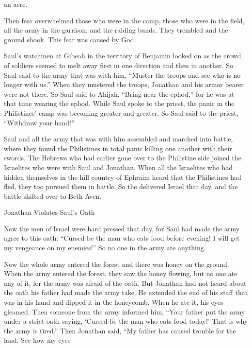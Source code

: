 {an acre.
\par }{\PP {}Then fear overwhelmed
those who were in the camp,
those who were in the field,
all
the army
in the garrison,
and the raiding bands.
They
trembled
and the ground
shook.
This fear
was
caused by God.
\par }{\PP {}Saul’s
watchmen
at Gibeah
in the territory of Benjamin
looked
on
as the crowd
of soldiers seemed to melt
away
first in one direction
and then in another.
So Saul
said
to the army
that
was with
him, “Muster
the troops and see
who
is no longer with
us.” When
they mustered
the troops,
Jonathan
and his armor
bearer
were not there.
So Saul
said
to Ahijah,
“Bring near
the ephod,” for
he was
at that time wearing the ephod.
While
Saul
spoke to
the priest,
the panic
in the Philistines’
camp
was becoming
greater and greater.
So Saul
said
to
the priest,
“Withdraw
your hand!”
\par }{\PP {}Saul
and all
the army
that
was with
him assembled and marched
into battle,
where they found
the Philistines
in total panic
killing
one
another
with
their swords.
The Hebrews
who had earlier
gone
over to the Philistine
side
joined
the Israelites
who
were with
Saul
and Jonathan.
When
all
the Israelites
who had hidden
themselves in the hill country
of Ephraim
heard
that
the Philistines
had fled,
they too
pursued
them
in battle.
So the
{}
delivered
Israel
that day,
and the battle
shifted
over to Beth Aven.
\par }{\SH Jonathan Violates Saul’s Oath
\par }{\PP {}Now the men
of Israel
were hard pressed
that day,
for Saul
had made
the army
agree to this oath: “Cursed
be the man
who
eats
food
before
evening! I will get my vengeance
on my enemies!” So no
one
in the army
ate
anything.
\par }{\PP {}Now the whole
army
entered
the forest
and there was
honey
on
the ground.
When the army
entered
the forest,
they saw
the honey
flowing,
but no
one ate
any of it,
for
the army
was afraid
of the oath.
But Jonathan
had not
heard
about the oath
his father
had made the army
take. He extended
the
end
of his staff
that
was in his hand
and dipped
it in the
honeycomb.
When
he ate it, his eyes gleamed.
Then
someone
from the army
informed him, “Your father
put the army
under a strict
oath
saying,
‘Cursed
be the man
who eats
food
today!’ That is why the army
is tired.”
Then Jonathan
said,
“My father
has caused
trouble for the land.
See
how
my eyes
}
